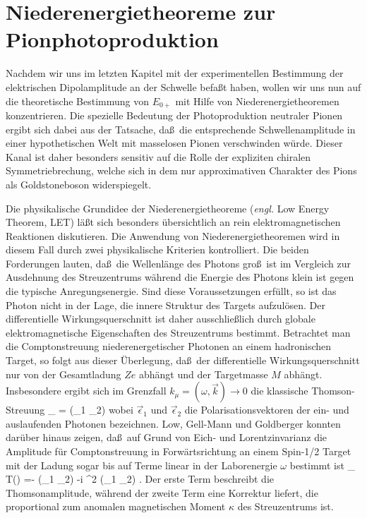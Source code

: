 \chapter{Niederenergietheoreme zur Pionphotoproduktion}
Nachdem wir uns im letzten Kapitel mit der experimentellen 
Bestimmung der elektrischen Dipolamplitude an der Schwelle
befa\ss t haben, wollen wir uns nun auf die theoretische 
Bestimmung von $E_{0+}$ mit Hilfe von Niederenergietheoremen
konzentrieren. Die spezielle Bedeutung der Photoproduktion
neutraler Pionen ergibt sich dabei aus der Tatsache, da\ss\
die entsprechende Schwellenamplitude in einer hypothetischen Welt
mit masselosen Pionen  verschwinden w\"urde.
Dieser Kanal ist daher besonders sensitiv auf die Rolle der
expliziten chiralen Symmetriebrechung, welche sich in  dem
nur approximativen Charakter des Pions als Goldstoneboson 
widerspiegelt. 

Die physikalische Grundidee der Niederenergietheoreme
({\em engl.} Low Energy Theorem, LET) l\"a\ss t sich besonders
\"ubersichtlich an rein elektromagnetischen Reaktionen
diskutieren. Die Anwendung  von Niederenergietheoremen wird 
in diesem Fall durch zwei physikalische Kriterien kontrolliert. 
Die beiden Forderungen lauten, da\ss\ die Wellenl\"ange des 
Photons gro\ss\ ist im Vergleich zur Ausdehnung des Streuzentrums
w\"ahrend die Energie des Photons klein ist gegen die typische 
Anregungsenergie. Sind diese Voraussetzungen erf\"ullt, so ist das 
Photon nicht in der Lage, die innere Struktur des Targets aufzul\"osen. 
Der differentielle Wirkungsquerschnitt ist daher ausschlie\ss lich durch 
globale elektromagnetische Eigenschaften des Streuzentrums bestimmt.
Betrachtet man die Comptonstreuung niederenergetischer
Photonen an einem hadronischen Target, so folgt aus dieser
\"Uberlegung, da\ss\ der differentielle Wirkungsquerschnitt 
nur von der Gesamtladung $Ze$ abh\"angt und der Targetmasse $M$ 
abh\"angt. Insbesondere ergibt 
sich im Grenzfall $k_\mu=(\omega,\vec{k})\to 0$ die klassische
Thomson-Streuung
\be
\label{thomson}
 \lim_{\omega {}}  =
   (\vec{\epsilon}_1 \cdot\vec{\epsilon}_2)
\ee     
wobei $\vec{\epsilon}_1$ und $\vec{\epsilon}_2$ die 
Polarisationsvektoren der ein- und auslaufenden Photonen
bezeichnen. Low, Gell-Mann und Goldberger \cite{Low54,Low58,GMG54}
konnten dar\"uber hinaus zeigen, da\ss\ auf Grund von 
Eich- und Lorentzinvarianz die Amplitude f\"ur Comptonstreuung 
in Forw\"artsrichtung an einem Spin-1/2 Target mit der Ladung sogar bis
auf Terme linear in der Laborenergie $\omega$ bestimmt ist
\be
 \lim_{\omega {}}  T(\omega) =-   
  (\vec{\epsilon}_1 \cdot\vec{\epsilon}_2) -i 
  \kappa^2 \omega  (\vec{\epsilon}_1 \times\vec{\epsilon}_2)
  \cdot \vec{\sigma} \; .
\ee
Der erste Term beschreibt  die Thomsonamplitude, w\"ahrend der
zweite Term eine Korrektur liefert, die proportional zum
anomalen magnetischen Moment $\kappa$ des Streuzentrums ist.

